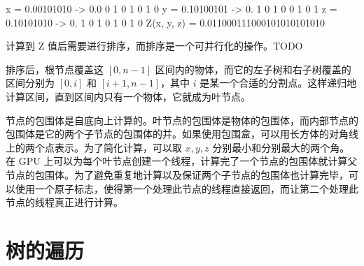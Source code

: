 \begin{codeblock}
                        x = 0.00101010 -> 0.0  0  1  0  1  0  1  0
                        y = 0.10100101 -> 0. 1  0  1  0  0  1  0  1
                        z = 0.10101010 -> 0.  1  0  1  0  1  0  1  0
                             Z(x, y, z) = 0.011000111000101010101010
\end{codeblock}

计算到 Z 值后需要进行排序，而排序是一个可并行化的操作。TODO

排序后，根节点覆盖这 $[0, n-1]$ 区间内的物体，而它的左子树和右子树覆盖的区间分别为 $[0, i]$ 和 $[i+1,n-1]$，其中 $i$ 是某一个合适的分割点。这样递归地计算区间，直到区间内只有一个物体，它就成为叶节点。

节点的包围体是自底向上计算的。叶节点的包围体是物体的包围体，而内部节点的包围体是它的两个子节点的包围体的并。如果使用包围盒，可以用长方体的对角线上的两个点表示。为了简化计算，可以取 $x,y,z$ 分别最小和分别最大的两个角。在 GPU 上可以为每个叶节点创建一个线程，计算完了一个节点的包围体就计算父节点的包围体。为了避免重复地计算以及保证两个子节点的包围体也计算完毕，可以使用一个原子标志，使得第一个处理此节点的线程直接返回，而让第二个处理此节点的线程真正进行计算。

\section{树的遍历}


